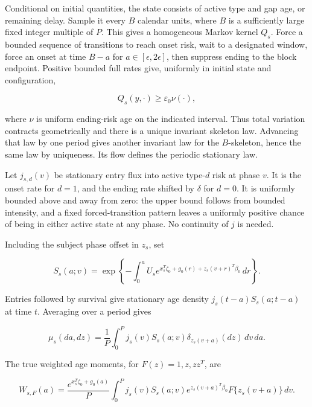 \documentclass[11pt]{article}
\begin{document}
Conditional on initial quantities, the state consists of active type and gap age, or remaining delay. Sample it every \(B\) calendar units, where \(B\) is a sufficiently large fixed integer multiple of \(P\). This gives a homogeneous Markov kernel \(Q_s\). Force a bounded sequence of transitions to reach onset risk, wait to a designated window, force an onset at time \(B-a\) for \(a\in[\epsilon,2\epsilon]\), then suppress ending to the block endpoint. Positive bounded full rates give, uniformly in initial state and configuration,

\begin{equation*}
Q_s(y,\cdot)\geq\varepsilon_0\nu(\cdot),
\tag{B.4}\label{eq:B.4}
\end{equation*}

where \(\nu\) is uniform ending-risk age on the indicated interval. Thus total variation contracts geometrically and there is a unique invariant skeleton law. Advancing that law by one period gives another invariant law for the \(B\)-skeleton, hence the same law by uniqueness. Its flow defines the periodic stationary law.

Let \(j_{s,d}(v)\) be stationary entry flux into active type-\(d\) risk at phase \(v\). It is the onset rate for \(d=1\), and the ending rate shifted by \(\delta\) for \(d=0\). It is uniformly bounded above and away from zero: the upper bound follows from bounded intensity, and a fixed forced-transition pattern leaves a uniformly positive chance of being in either active state at any phase. No continuity of \(j\) is needed.

Including the subject phase offset in \(z_s\), set

\begin{equation*}
S_s(a;v)=\exp\left\{-\int_0^a
 U_s e^{x_s^T\zeta_0+g_0(r)+z_s(v+r)^T\beta_0}\,dr\right\}.
\tag{B.5}\label{eq:B.5}
\end{equation*}

Entries followed by survival give stationary age density
\(j_s(t-a)S_s(a;t-a)\) at time \(t\). Averaging over a period gives

\begin{equation*}
\mu_s(da,dz)=\frac1P\int_0^Pj_s(v)S_s(a;v)
 \delta_{z_s(v+a)}(dz)\,dv\,da.
\tag{B.6}\label{eq:B.6}
\end{equation*}

The true weighted age moments, for \(F(z)=1,z,zz^T\), are

\begin{equation*}
W_{s,F}(a)=\frac{e^{x_s^T\zeta_0+g_0(a)}}P
 \int_0^Pj_s(v)S_s(a;v)e^{z_s(v+a)^T\beta_0}F\{z_s(v+a)\}\,dv.
\tag{B.7}\label{eq:B.7}
\end{equation*}
\end{document}
